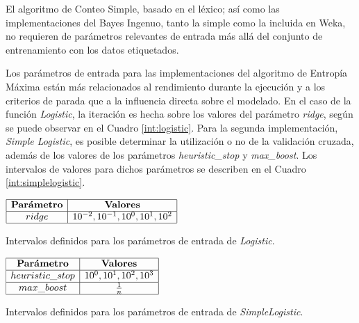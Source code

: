 El algoritmo de Conteo Simple, basado en el l\'exico; as\'i como las implementaciones del Bayes Ingenuo, tanto la simple como la incluida en Weka, no requieren de par\'ametros relevantes de entrada m\'as all\'a del conjunto de entrenamiento con los datos etiquetados.
\newline

Los par\'ametros de entrada para las implementaciones del algoritmo de Entrop\'ia M\'axima est\'an m\'as relacionados al rendimiento durante la ejecuci\'on y a los criterios de parada que a la influencia directa sobre el modelado. En el caso de la funci\'on \textit{Logistic}, la iteraci\'on es hecha sobre los valores del par\'ametro \textit{ridge}, seg\'un se puede observar en el Cuadro \ref{int:logistic}. Para la segunda implementaci\'on, \textit{Simple Logistic}, es posible determinar la utilizaci\'on o no de la validaci\'on cruzada, adem\'as de los valores de los par\'ametros \textit{heuristic\_stop} y \textit{max\_boost}. Los intervalos de valores para dichos par\'ametros se describen en el Cuadro \ref{int:simplelogistic}.
\newline

\begin{table}[htb] 
\centering

$
\begin{array}{|c|c|}
      \hline
      \mathbf{Par\acute{a}metro}	& \mathbf{Valores}		\\
      \hline
      ridge		& 10^{-2}, 10^{-1}, 10^{0}, 10^{1}, 10^{2} 	\\
      \hline
\end{array}
$
\caption{Intervalos definidos para los par\'ametros de entrada de \textit{Logistic}.}
\label{int:logistic}
\end{table}

\begin{table}[htb] 
\centering

$
\begin{array}{|c|c|}
      \hline
      \mathbf{Par\acute{a}metro}	& \mathbf{Valores}		\\
      \hline
      heuristic\_stop	& 10^{0}, 10^{1}, 10^{2}, 10^{3} 	\\
      \hline
      max\_boost			& 1 \over n 						\\
      \hline
\end{array}
$

\caption{Intervalos definidos para los par\'ametros de entrada de \textit{SimpleLogistic}.}
\label{int:simplelogistic}
\end{table}

